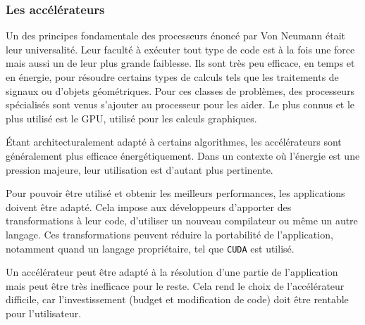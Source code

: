        
        \subsubsection{Les accélérateurs}
            Un des principes fondamentale des processeurs énoncé par Von Neumann était leur universalité. Leur faculté à exécuter tout type de code est à la fois une force mais aussi un de leur plus grande faiblesse. Ils sont très peu efficace, en temps et en énergie, pour résoudre certains types de calculs tels que les traitements de signaux ou d'objets géométriques. Pour ces classes de problèmes, des processeurs spécialisés sont venus s'ajouter au processeur pour les aider. Le plus connus et le plus utilisé est le GPU, utilisé pour les calculs graphiques.
            
            Étant architecturalement adapté à certains algorithmes, les accélérateurs sont généralement plus efficace énergétiquement. Dans un contexte où l'énergie est une pression majeure, leur utilisation est d'autant plus pertinente.
             
            Pour pouvoir être utilisé et obtenir les meilleurs performances, les applications doivent être adapté. Cela impose aux développeurs d'apporter des transformations à leur code, d'utiliser un nouveau compilateur ou même un autre langage. Ces transformations peuvent réduire la portabilité de l'application, notamment quand un langage propriétaire, tel que \verb|CUDA| est utilisé.
            
            Un accélérateur peut être adapté à la résolution d'une partie de l'application mais peut être très inefficace pour le reste. Cela rend le choix de l'accélérateur difficile, car l'investissement (budget et modification de code) doit être rentable pour l'utilisateur.

    
